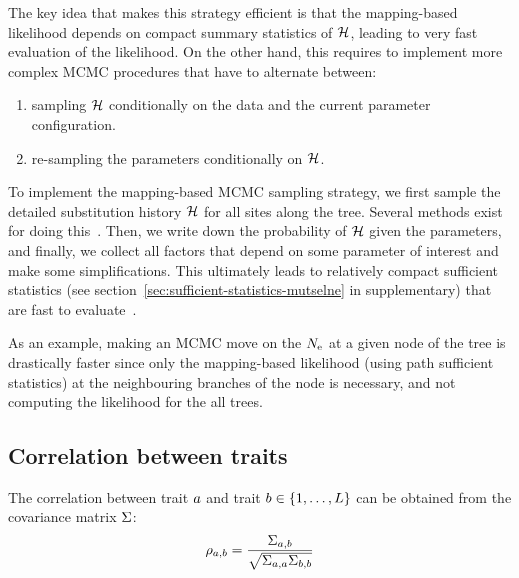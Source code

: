 The key idea that makes this strategy efficient is that the mapping-based likelihood depends on compact summary statistics of $\mathcal{H}$, leading to very fast evaluation of the likelihood.
On the other hand, this requires to implement more complex \acrshort{MCMC} procedures that have to alternate between:
\begin{enumerate}
    \item sampling $\mathcal{H}$ conditionally on the data and the current parameter configuration.
    \item re-sampling the parameters conditionally on $\mathcal{H}$.
\end{enumerate}

To implement the mapping-based \acrshort{MCMC} sampling strategy, we first sample the detailed substitution history $\mathcal{H}$ for all sites along the tree.
Several methods exist for doing this~\citep{Nielsen2002,Rodrigue2008}.
Then, we write down the probability of $\mathcal{H}$ given the parameters, and finally, we collect all factors that depend on some parameter of interest and make some simplifications.
This ultimately leads to relatively compact sufficient statistics (see section~\ref{sec:sufficient-statistics-mutselne} in supplementary) that are fast to evaluate~\citep{Irvahn2014,Davydov2016}.

As an example, making an \acrshort{MCMC} move on the $N_{\text{e}}$ at a given node of the tree is drastically faster since only the mapping-based likelihood (using path sufficient statistics) at the neighbouring branches of the node is necessary, and not computing the likelihood for the all trees.

\subsection{Correlation between traits}
\label{sec:Correlation}
The correlation between trait $a$ and trait $b \in \{1, \hdots, L\}$ can be obtained from the covariance matrix $\Sigma$:
\begin{equation}
    \rho_{a, b} = \dfrac{\Sigma_{a, b}}{\sqrt{\Sigma_{a, a} \Sigma_{b, b}}}
\end{equation}

